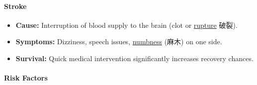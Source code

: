 \paragraph{Stroke}
\begin{itemize}
    \item \textbf{Cause:} Interruption of blood supply to the brain (clot or \underline{rupture} 破裂).
    \item \textbf{Symptoms:} Dizziness, speech issues, \underline{numbness} (麻木) on one side.
    \item \textbf{Survival:} Quick medical intervention significantly increases recovery chances.
\end{itemize}

\paragraph{Risk Factors}
